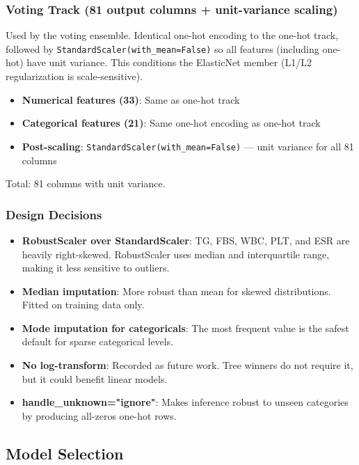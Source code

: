 \documentclass[conference]{IEEEtran}
\begin{document}
\subsubsection{Voting Track (81 output columns + unit-variance scaling)}

Used by the voting ensemble. Identical one-hot encoding to the one-hot track, followed by \texttt{StandardScaler(with\_mean=False)} so all features (including one-hot) have unit variance. This conditions the ElasticNet member (L1/L2 regularization is scale-sensitive).

\begin{itemize}
    \item \textbf{Numerical features (33)}: Same as one-hot track
    \item \textbf{Categorical features (21)}: Same one-hot encoding as one-hot track
    \item \textbf{Post-scaling}: \texttt{StandardScaler(with\_mean=False)} --- unit variance for all 81 columns
\end{itemize}

Total: 81 columns with unit variance.

\subsubsection{Design Decisions}

\begin{itemize}
    \item \textbf{RobustScaler over StandardScaler}: TG, FBS, WBC, PLT, and ESR are heavily right-skewed. RobustScaler uses median and interquartile range, making it less sensitive to outliers.
    \item \textbf{Median imputation}: More robust than mean for skewed distributions. Fitted on training data only.
    \item \textbf{Mode imputation for categoricals}: The most frequent value is the safest default for sparse categorical levels.
    \item \textbf{No log-transform}: Recorded as future work. Tree winners do not require it, but it could benefit linear models.
    \item \textbf{handle\_unknown="ignore"}: Makes inference robust to unseen categories by producing all-zeros one-hot rows.
\end{itemize}

\subsection{Model Selection}
\end{document}
